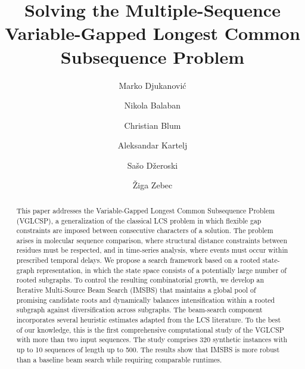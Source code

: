 \documentclass[runningheads]{llncs}
\begin{document}
	\title{Solving the Multiple-Sequence Variable-Gapped Longest Common Subsequence Problem}
	
	\author{
		Marko Djukanović  \and
		Nikola Balaban   \and
		Christian Blum  \and 
		Aleksandar Kartelj  \and
		Sašo Džeroski  \and
		Žiga Zebec
	}
	\maketitle              %
	
	\begin{abstract}
		This paper addresses the Variable-Gapped Longest Common Subsequence Problem (VGLCSP), a generalization of the classical LCS problem in which flexible gap constraints are imposed between consecutive characters of a solution. The problem arises in molecular sequence comparison, where structural distance constraints between residues must be respected, and in time-series analysis, where events must occur within prescribed temporal delays. We propose a search framework based on a rooted state-graph representation, in which the state space consists of a potentially large number of rooted subgraphs. To control the resulting combinatorial growth, we develop an Iterative Multi-Source Beam Search (IMSBS) that maintains a global pool of promising candidate roots and dynamically balances intensification within a rooted subgraph against diversification across subgraphs. The beam-search component incorporates several heuristic estimates adapted from the LCS literature. To the best of our knowledge, this is the first comprehensive computational study of the VGLCSP with more than two input sequences. The study comprises 320 synthetic instances with up to 10 sequences of length up to 500. The results show that IMSBS is more robust than a baseline beam search while requiring comparable runtimes.
	\end{abstract}
\end{document}
